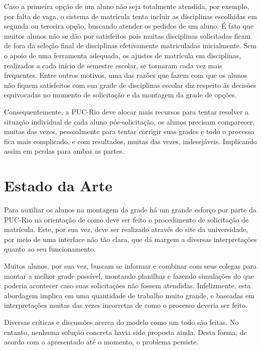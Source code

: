 \documentclass[graduacao,brazil]{ThesisPUC}
\begin{document}
Caso a primeira opção de um aluno não seja totalmente atendida, por exemplo, por falta de vaga, o sistema de matrícula tenta incluir as disciplinas escolhidas em segunda ou terceira opção, buscando atender os pedidos de um aluno. É fato que muitos alunos não se dão por satisfeitos pois muitas disciplinas solicitadas ficam de fora da seleção final de disciplinas efetivamente matriculadas inicialmente. Sem o apoio de uma ferramenta adequada, os ajustes de matrícula em disciplinas, realizados a cada início de semestre escolar, se tornaram cada vez mais frequentes. Entre outros motivos, uma das razões que fazem com que os alunos não fiquem satisfeitos com sua grade de disciplinas escolar diz respeito às decisões equivocadas no momento de solicitação e da montagem da grade de opções.

Consequentemente, a PUC-Rio deve alocar mais recursos para tentar resolver a situação individual de cada aluno pós-solicitação, os alunos precisam comparecer, muitas das vezes, pessoalmente para tentar corrigir suas grades e todo o processo fica mais complicado, e com resultados, muitas das vezes, indesejáveis. Implicando assim em perdas para ambas as partes.


\chapter{Estado da Arte}

Para auxiliar os alunos na montagem da grade há um grande esforço por parte da PUC-Rio na orientação de como deve ser feito o procedimento de solicitação de matrícula. Este, por sua vez, deve ser realizado através do site da universidade, por meio de uma interface não tão clara, que dá margem a diversas interpretações quanto ao seu funcionamento.

Muitos alunos, por sua vez, buscam se informar e combinar com seus colegas para montar a melhor grade possível, montando planilhas e fazendo simulações do que poderia acontecer caso suas solicitações não fossem atendidas. Infelizmente, esta abordagem implica em uma quantidade de trabalho muito grande, e baseadas em interpretações muitas das vezes incorretas de como o processo deveria ser feito.

Diversas críticas e discussões acerca do modelo como um todo são feitas. No entanto, nenhuma solução concreta havia sido proposta ainda. Desta forma, de acordo com o apresentado até o momento, o problema persiste.
\end{document}
